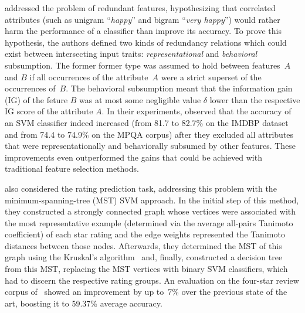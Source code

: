 
\citet{Riloff:06} addressed the problem of redundant features,
hypothesizing that correlated attributes (such as unigram
``\emph{happy}'' and bigram ``\emph{very happy}'') would rather harm
the performance of a classifier than improve its accuracy.  To prove
this hypothesis, the authors defined two kinds of redundancy relations
which could exist between intersecting input traits:
\emph{representational} and \emph{behavioral} subsumption.  The former
former type was assumed to hold between features~$A$ and $B$ if all
occurrences of the attribute~$A$ were a strict superset of the
occurrences of~$B$.  The behavioral subsumption meant that the
information gain (IG) \cite{Forman:03} of the feture $B$ was at most
some negligible value $\delta$ lower than the respective IG score of
the attribute $A$.  In their experiments, \citeauthor{Riloff:06}
observed that the accuracy of an SVM classifier indeed increased (from
81.7 to 82.7\% on the IMDBP dataset and from 74.4 to 74.9\% on the
MPQA corpus) after they excluded all attributes that were
representationally and behaviorally subsumed by other features.  These
improvements even outperformed the gains that could be achieved with
traditional feature selection methods.


\citet{Bickerstaffe:10} also considered the rating prediction task,
addressing this problem with the minimum-spanning-tree (MST) SVM
approach.  In the initial step of this method, they constructed a
strongly connected graph whose vertices were associated with the most
representative example (determined via the average all-pairs Tanimoto
coefficient) of each star rating and the edge weights represented the
Tanimoto distances between those nodes.  Afterwards, they determined
the MST of this graph using the Kruskal's
algorithm~\cite[see][pp.~567--574]{Cormen:09} and, finally,
constructed a decision tree from this MST, replacing the MST vertices
with binary SVM classifiers, which had to discern the respective
rating groups. An evaluation on the four-star review corpus
of~\citet{Pang:05} showed an improvement by up to~7\% over the
previous state of the art, boosting it to 59.37\% average accuracy.


